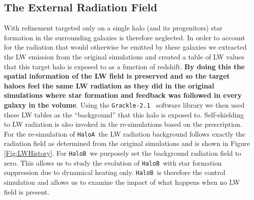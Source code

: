 \documentclass[twocolumn,iop,revtex4]{openjournal}
\newcommand{\grackle}{\texttt{Grackle-2.1~}}
\newcommand{\ha} {\texttt{HaloA~}}
\newcommand{\hb} {\texttt{HaloB~}}
\begin{document}
 \subsection{The External Radiation Field} \label{Sec:LWRadField}
 With refinement targeted only on a single halo (and its progenitors) star formation in the
 surrounding galaxies is therefore neglected. In order to account for the radiation that would
 otherwise be emitted by these galaxies we extracted the LW emission from the original simulations
 and created a table of LW values that this target halo is exposed to as a function of
 redshift. \textbf{By doing this the spatial information of the LW field is preserved and so the target haloes feel the same LW radiation as they did in the original simulations where star formation and feedback was followed in every galaxy in the volume}. Using the \grackle \citep{Grackle} software library we then used these LW tables as
 the ``background'' that this halo is exposed to. Self-shielding to LW radiation is also invoked in
 the re-simulations based on the \cite{Wolcott-Green_2011} prescription.\\
 \indent For the re-simulation of \ha the LW radiation background follows exactly the radiation
 field as determined from the original simulations and is shown in Figure \ref{Fig:LWHistory}.
 For \hb we purposely set the background radiation field to zero. This allows us to study the
 evolution of \hb with star formation suppression due to dynamical heating only. \hb is therefore
 the control simulation and allows us to examine the impact of what happens when
 no LW field is present. 
 
\end{document}
